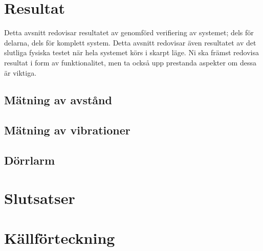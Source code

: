\documentclass{article}
\begin{document}
\section{Resultat}
Detta avsnitt redovisar resultatet av genomförd verifiering av systemet; dels för delarna, dels för komplett system. 
Detta avsnitt redovisar även resultatet av det slutliga fysiska testet när hela systemet körs i skarpt läge. 
Ni ska främst redovisa resultat i form av funktionalitet, men ta också upp prestanda aspekter om dessa är viktiga.

\subsection{Mätning av avstånd}

\subsection{Mätning av vibrationer}

\subsection{Dörrlarm}

\section{Slutsatser}


\newpage
\section{Källförteckning}
\printbibliography[heading=none]
\end{document}
